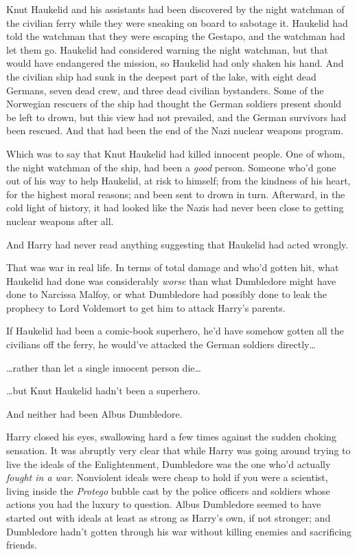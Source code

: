 Knut Haukelid and his assistants had been discovered by the night watchman of 
the civilian ferry while they were sneaking on board to sabotage it. Haukelid 
had told the watchman that they were escaping the Gestapo, and the watchman had 
let them go. Haukelid had considered warning the night watchman, but that would 
have endangered the mission, so Haukelid had only shaken his hand. And the 
civilian ship had sunk in the deepest part of the lake, with eight dead 
Germans, seven dead crew, and three dead civilian bystanders. Some of the 
Norwegian rescuers of the ship had thought the German soldiers present should 
be left to drown, but this view had not prevailed, and the German survivors had 
been rescued. And that had been the end of the Nazi nuclear weapons program.

Which was to say that Knut Haukelid had killed innocent people. One of whom, 
the night watchman of the ship, had been a \emph{good} person. Someone who'd 
gone out of his way to help Haukelid, at risk to himself; from the kindness of 
his heart, for the highest moral reasons; and been sent to drown in turn. 
Afterward, in the cold light of history, it had looked like the Nazis had never 
been close to getting nuclear weapons after all.

And Harry had never read anything suggesting that Haukelid had acted wrongly.

That was war in real life. In terms of total damage and who'd gotten hit, what 
Haukelid had done was considerably \emph{worse} than what Dumbledore might have 
done to Narcissa Malfoy, or what Dumbledore had possibly done to leak the 
prophecy to Lord Voldemort to get him to attack Harry's parents.

If Haukelid had been a comic-book superhero, he'd have somehow gotten all the 
civilians off the ferry, he would've attacked the German soldiers 
directly{\ldots}

{\ldots}rather than let a single innocent person die{\ldots}

{\ldots}but Knut Haukelid hadn't been a superhero.

And neither had been Albus Dumbledore.

Harry closed his eyes, swallowing hard a few times against the sudden choking 
sensation. It was abruptly very clear that while Harry was going around trying 
to live the ideals of the Enlightenment, Dumbledore was the one who'd actually 
\emph{fought in a war}. Nonviolent ideals were cheap to hold if you were a 
scientist, living inside the \emph{Protego} bubble cast by the police officers 
and soldiers whose actions you had the luxury to question. Albus Dumbledore 
seemed to have started out with ideals at least as strong as Harry's own, if 
not stronger; and Dumbledore hadn't gotten through his war without killing 
enemies and sacrificing friends.

